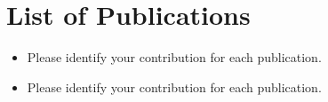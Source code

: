 \chapter*{List of Publications}

\begin{itemize}
    \item {}

	Please identify your contribution for each publication.

    \item {}

	Please identify your contribution for each publication.
\end{itemize}
